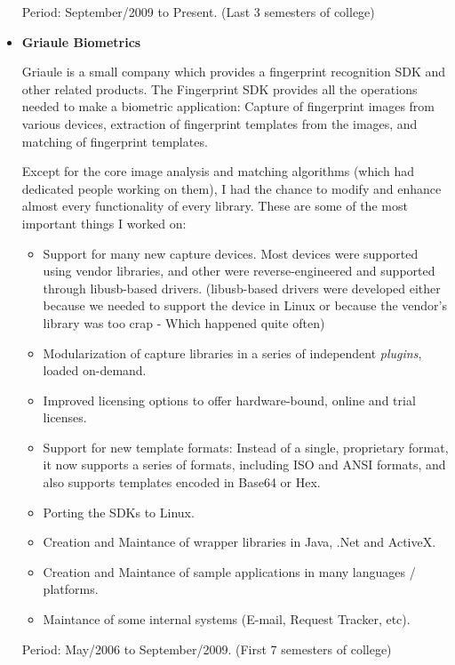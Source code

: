 \documentclass[a4paper,10pt]{article}
\begin{document}
\begin{itemize}
        Period: September/2009 to Present. {\small(Last 3 semesters of college)}

      \item  
        \textbf{Griaule Biometrics}

        Griaule is a small company which provides a fingerprint recognition SDK and other related products. The Fingerprint SDK provides all the operations needed to make a biometric application: Capture of fingerprint images from various devices, extraction of fingerprint templates from the images, and matching of fingerprint templates.

        Except for the core image analysis and matching algorithms (which had dedicated people working on them), I had the chance to modify and enhance almost every functionality of every library. These are some of the most important things I worked on:
        \begin{itemize}
          \item Support for many new capture devices. Most devices were supported using vendor libraries, and other were reverse-engineered and supported through libusb-based drivers. (libusb-based drivers were developed either because we needed to support the device in Linux or because the vendor's library was too crap - Which happened quite often)
          \item Modularization of capture libraries in a series of independent \emph{plugins}, loaded on-demand.
          \item Improved licensing options to offer hardware-bound, online and trial licenses.
          \item Support for new template formats: Instead of a single, proprietary format, it now supports a series of formats, including ISO and ANSI formats, and also supports templates encoded in Base64 or Hex.
          \item Porting the SDKs to Linux.
          \item Creation and Maintance of wrapper libraries in Java, .Net and ActiveX.
          \item Creation and Maintance of sample applications in many languages / platforms.
          \item Maintance of some internal systems (E-mail, Request Tracker, etc).
        \end{itemize}

        Period: May/2006 to September/2009. {\small(First 7 semesters of college)}


\end{itemize}
\end{document}
